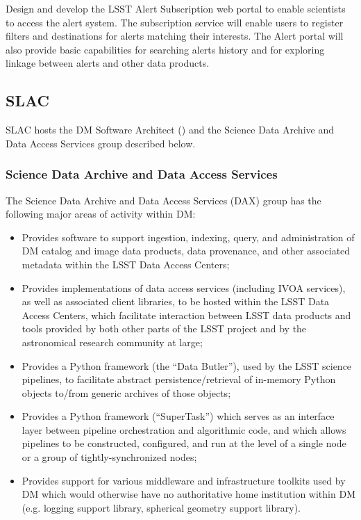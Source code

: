 Design and develop the \gls{LSST} \gls{Alert} Subscription web portal to enable scientists to access the alert system. The subscription service will enable users to register filters and destinations for alerts matching their interests. The \gls{Alert} portal will also provide basic capabilities for searching alerts history and for exploring linkage between alerts and other data products.




\subsection {SLAC\label{sect:slac}}
SLAC hosts the \gls{DM} Software Architect () and the Science Data \gls{Archive} and Data Access
Services group described below.

\subsubsection{Science Data \gls{Archive} and Data Access Services \label{sect:dax}}

The Science Data \gls{Archive} and Data Access Services (\gls{DAX}) group has the following major areas of activity
within \gls{DM}:

\begin{itemize}

  \item{Provides software to support ingestion, indexing, query, and administration of \gls{DM} catalog and image
  data products, data \gls{provenance}, and other associated \gls{metadata} within the \gls{LSST} Data Access Centers;}

  \item{Provides implementations of data access services (including \gls{IVOA} services), as well as associated
  client libraries, to be hosted within the \gls{LSST} Data Access Centers, which facilitate interaction between
  \gls{LSST} data products and tools provided by both other parts of the \gls{LSST} project and by the astronomical
  research community at large;}

  \item{Provides a Python framework (the ``Data \gls{Butler}''), used by the \gls{LSST} science pipelines, to facilitate
  abstract persistence/retrieval of in-memory Python objects to/from generic archives of those objects;}

  \item{Provides a Python framework (``SuperTask'') which serves as an interface layer between \gls{pipeline}
  orchestration and algorithmic code, and which allows pipelines to be constructed, configured, and run at
  the level of a single node or a group of tightly-synchronized nodes;}

  \item{Provides support for various middleware and infrastructure toolkits used by \gls{DM} which would otherwise
  have no authoritative home institution within DM (e.g. logging support library, spherical geometry support
  library).}

\end{itemize}

